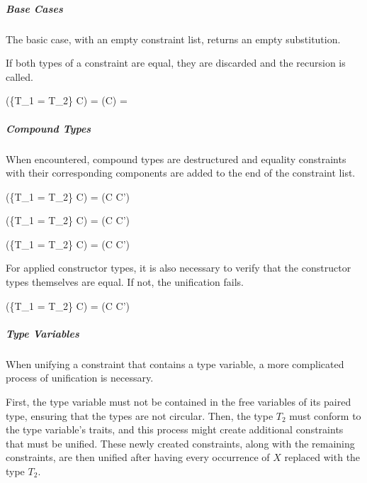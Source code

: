 \documentclass[class=article, crop=false]{standalone}
\begin{document}
\subparagraph{Base Cases}

The basic case, with an empty constraint list, returns an empty substitution.


If both types of a constraint are equal, they are discarded and the recursion is called.

  {\gamma \vdash {}(\{T_1 = T_2\} \cup C) = \gamma \vdash {}(C) = \sigma}

\subparagraph{Compound Types}

When encountered, compound types are destructured and equality constraints with their corresponding components are added to the end of the constraint list.

  {\gamma \vdash {}(\{T_1 = T_2\} \cup C) = \gamma \vdash {}(C \cup C')}

  {\gamma \vdash {}(\{T_1 = T_2\} \cup C) = \gamma \vdash {}(C \cup C')}

  {\gamma \vdash {}(\{T_1 = T_2\} \cup C) = \gamma \vdash {}(C \cup C')}

For applied constructor types, it is also necessary to verify that the constructor types themselves are equal.
If not, the unification fails.

  {\gamma \vdash {}(\{T_1 = T_2\} \cup C) = \gamma \vdash {}(C \cup C')}

\subparagraph{Type Variables}

When unifying a constraint that contains a type variable, a more complicated process of unification is necessary.

First, the type variable must not be contained in the free variables of its paired type, ensuring that the types are not circular.
Then, the type $T_2$ must conform to the type variable's traits, and this process might create additional constraints that must be unified.
These newly created constraints, along with the remaining constraints, are then unified after having every occurrence of $X$ replaced with the type $T_2$.
\end{document}
